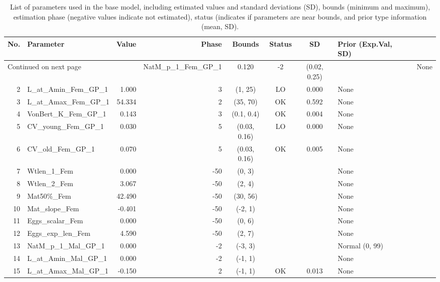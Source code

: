 \documentclass[12pt,]{article}
\begin{document}
\begin{landscape}
\begin{longtable}{rlrrcccl}
\caption{List of parameters used in
                                              the base model, including estimated 
                                              values and standard deviations (SD), 
                                              bounds (minimum and maximum), 
                                              estimation phase (negative values indicate
                                              not estimated), status (indicates if 
                                              parameters are near bounds, and prior type
                                              information (mean, SD).} \\ 
  \hline
No. & Parameter & Value & Phase & Bounds & Status & SD & Prior (Exp.Val, SD)  \\ 
  \hline 
\endhead 
\hline 
\multicolumn{3}{l}{\footnotesize Continued on next page} 
\endfoot 
\endlastfoot 
 \hline
1 & NatM\_p\_1\_Fem\_GP\_1 & 0.120 & -2 & (0.02, 0.25) &  &  & None \\ 
  2 & L\_at\_Amin\_Fem\_GP\_1 & 1.000 & 3 & (1, 25) & LO & 0.000 & None \\ 
  3 & L\_at\_Amax\_Fem\_GP\_1 & 54.334 & 2 & (35, 70) & OK & 0.592 & None \\ 
  4 & VonBert\_K\_Fem\_GP\_1 & 0.143 & 3 & (0.1, 0.4) & OK & 0.004 & None \\ 
  5 & CV\_young\_Fem\_GP\_1 & 0.030 & 5 & (0.03, 0.16) & LO & 0.000 & None \\ 
  6 & CV\_old\_Fem\_GP\_1 & 0.070 & 5 & (0.03, 0.16) & OK & 0.005 & None \\ 
  7 & Wtlen\_1\_Fem & 0.000 & -50 & (0, 3) &  &  & None \\ 
  8 & Wtlen\_2\_Fem & 3.067 & -50 & (2, 4) &  &  & None \\ 
  9 & Mat50\%\_Fem & 42.490 & -50 & (30, 56) &  &  & None \\ 
  10 & Mat\_slope\_Fem & -0.401 & -50 & (-2, 1) &  &  & None \\ 
  11 & Eggs\_scalar\_Fem & 0.000 & -50 & (0, 6) &  &  & None \\ 
  12 & Eggs\_exp\_len\_Fem & 4.590 & -50 & (2, 7) &  &  & None \\ 
  13 & NatM\_p\_1\_Mal\_GP\_1 & 0.000 & -2 & (-3, 3) &  &  & Normal (0, 99) \\ 
  14 & L\_at\_Amin\_Mal\_GP\_1 & 0.000 & -2 & (-1, 1) &  &  & None \\ 
  15 & L\_at\_Amax\_Mal\_GP\_1 & -0.150 & 2 & (-1, 1) & OK & 0.013 & None \\ 

\end{longtable}
\end{landscape}
\end{document}
